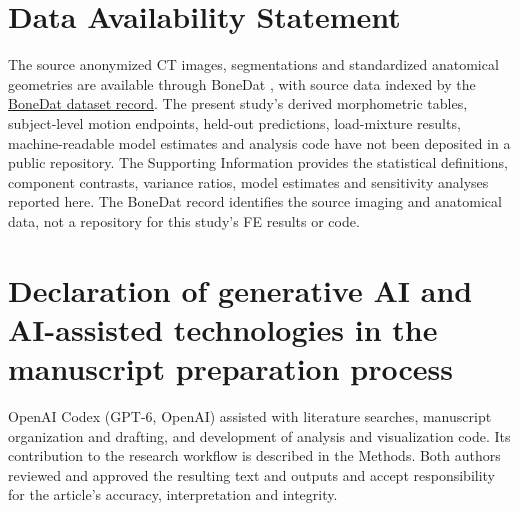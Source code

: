 \documentclass[11pt,a4paper]{article}
\begin{document}
\section*{Data Availability Statement}
The source anonymized CT images, segmentations and standardized anatomical geometries are available through BoneDat \citep{HenyssKuchar2025BoneDat}, with source data indexed by the \href{https://doi.org/10.5281/zenodo.15189761}{BoneDat dataset record}. The present study's derived morphometric tables, subject-level motion endpoints, held-out predictions, load-mixture results, machine-readable model estimates and analysis code have not been deposited in a public repository. The Supporting Information provides the statistical definitions, component contrasts, variance ratios, model estimates and sensitivity analyses reported here. The BoneDat record identifies the source imaging and anatomical data, not a repository for this study's FE results or code.

\section*{Declaration of generative AI and AI-assisted technologies in the manuscript preparation process}
OpenAI Codex (GPT-6, OpenAI) assisted with literature searches, manuscript organization and drafting, and development of analysis and visualization code. Its contribution to the research workflow is described in the Methods. Both authors reviewed and approved the resulting text and outputs and accept responsibility for the article's accuracy, interpretation and integrity.



\end{document}
